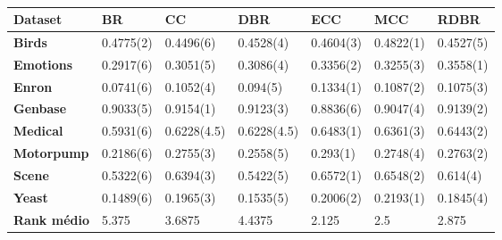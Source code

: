 \begin{table}[h]
\begin{tabular}{lllllll}
\hline
\textbf{Dataset} & \textbf{BR} & \textbf{CC} & \textbf{DBR} & \textbf{ECC} & \textbf{MCC} & \textbf{RDBR} \\ \hline
\textbf{Birds}           & 0.4775(2)   & 0.4496(6)   & 0.4528(4)    & 0.4604(3)    & 0.4822(1)    & 0.4527(5)     \\
\textbf{Emotions}        & 0.2917(6)   & 0.3051(5)   & 0.3086(4)    & 0.3356(2)    & 0.3255(3)    & 0.3558(1)     \\
\textbf{Enron}           & 0.0741(6)   & 0.1052(4)   & 0.094(5)     & 0.1334(1)    & 0.1087(2)    & 0.1075(3)     \\
\textbf{Genbase}         & 0.9033(5)   & 0.9154(1)   & 0.9123(3)    & 0.8836(6)    & 0.9047(4)    & 0.9139(2)     \\
\textbf{Medical}         & 0.5931(6)   & 0.6228(4.5) & 0.6228(4.5)  & 0.6483(1)    & 0.6361(3)    & 0.6443(2)     \\
\textbf{Motorpump}       & 0.2186(6)   & 0.2755(3)   & 0.2558(5)    & 0.293(1)     & 0.2748(4)    & 0.2763(2)     \\
\textbf{Scene}           & 0.5322(6)   & 0.6394(3)   & 0.5422(5)    & 0.6572(1)    & 0.6548(2)    & 0.614(4)      \\
\textbf{Yeast}           & 0.1489(6)   & 0.1965(3)   & 0.1535(5)    & 0.2006(2)    & 0.2193(1)    & 0.1845(4)     \\ \hline
\textbf{Rank médio}      & 5.375       & 3.6875      & 4.4375       & 2.125        & 2.5          & 2.875         \\ \hline
\end{tabular}
\caption{}
\label{tab:SAsvm}
\end{table}